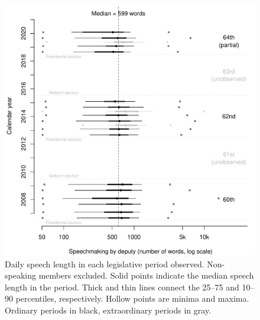 \documentclass[letter,12pt]{article}
\begin{document}
\begin{figure}
  \centering
    \includegraphics[width=.8\columnwidth]{../plots/quantiles-periodo.pdf}
    \caption{Daily speech length in each legislative period observed. Non-speaking members excluded. Solid points indicate the median speech length in the period. Thick and thin lines connect the 25--75 and 10--90 percentiles, respectively. Hollow points are minima and maxima. Ordinary periods in black, extraordinary periods in gray.}\label{F:quantiles}
\end{figure}

\end{document}
